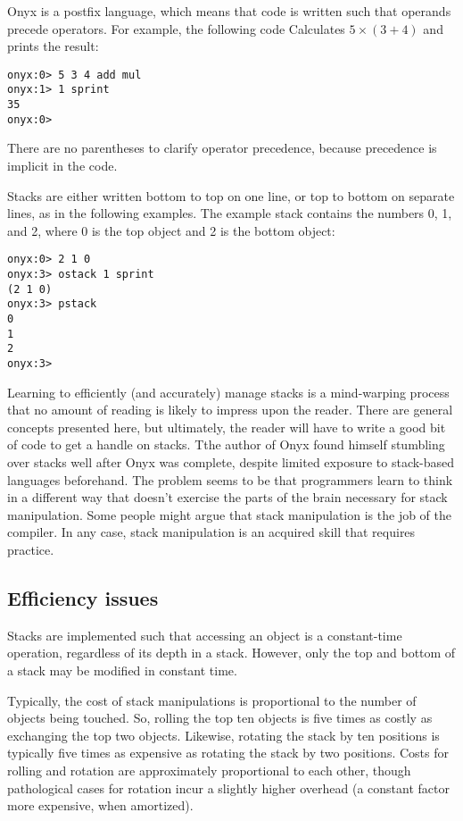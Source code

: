 Onyx is a postfix language, which means that code is written such that operands
precede operators.  For example, the following code Calculates $5 \times (3 +
4)$ and prints the result:

\begin{verbatim}
onyx:0> 5 3 4 add mul
onyx:1> 1 sprint
35
onyx:0>
\end{verbatim}

There are no parentheses to clarify operator precedence, because precedence is
implicit in the code.

Stacks are either written bottom to top on one line, or top to bottom on
separate lines, as in the following examples.  The example stack contains the
numbers 0, 1, and 2, where 0 is the top object and 2 is the bottom object:

\begin{verbatim}
onyx:0> 2 1 0
onyx:3> ostack 1 sprint
(2 1 0)
onyx:3> pstack
0
1
2
onyx:3>
\end{verbatim}

Learning to efficiently (and accurately) manage stacks is a mind-warping process
that no amount of reading is likely to impress upon the reader.  There are
general concepts presented here, but ultimately, the reader will have to write a
good bit of code to get a handle on stacks.  Tthe author of Onyx found himself
stumbling over stacks well after Onyx was complete, despite limited exposure to
stack-based languages beforehand.  The problem seems to be that programmers
learn to think in a different way that doesn't exercise the parts of the brain
necessary for stack manipulation.  Some people might argue that stack
manipulation is the job of the compiler.  In any case, stack manipulation is an
acquired skill that requires practice.

\subsection{Efficiency issues}

Stacks are implemented such that accessing an object is a constant-time
operation, regardless of its depth in a stack.  However, only the top and
bottom of a stack may be modified in constant time.

Typically, the cost of stack manipulations is proportional to the number of
objects being touched.  So, rolling the top ten objects is five times as costly
as exchanging the top two objects.  Likewise, rotating the stack by ten
positions is typically five times as expensive as rotating the stack by two
positions.  Costs for rolling and rotation are approximately proportional to
each other, though pathological cases for rotation incur a slightly higher
overhead (a constant factor more expensive, when amortized).

